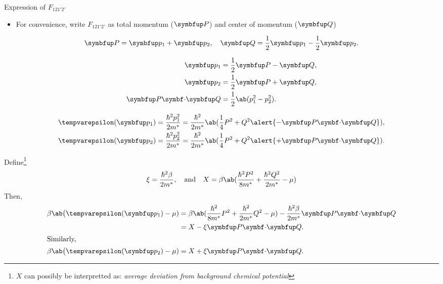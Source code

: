 \begin{frame}{Expression of \(F_{121'2'}\)}
  \begin{itemize}
    \item For convenience, write \(F_{121'2'}\) as \alert{total momentum} (\(\vv{P}\)) and \alert{center of momentum} (\(\vv{Q}\))
  \end{itemize}

  \begin{blk}{}
    \begin{equation}
      \vv{P} = \vv{p}_1 + \vv{p}_2, \quad \vv{Q} = \frac{1}{2}\vv{p}_1 - \frac{1}{2}\vv{p}_2.
    \end{equation}
  \end{blk}
\end{frame}

\begin{frame}
  \begin{align}
    \vv{p}_1            & = \frac{1}{2}\vv{P} - \vv{Q},    \\
    \vv{p}_2            & = \frac{1}{2}\vv{P} + \vv{Q},    \\
    \vv{P} \vdot \vv{Q} & = \frac{1}{2}\ab(p_1^2 - p_2^2).
  \end{align}

  \begin{align}
    \epsilon(\vv{p}_1) & = \frac{\hbar^2 p_1^2}{2 m^*} = \frac{\hbar^2}{2 m^*}\ab(\frac{1}{4}P^2 + Q^2 \alert{- \vv{P} \vdot \vv{Q}}), \\
    \epsilon(\vv{p}_2) & = \frac{\hbar^2 p_2^2}{2 m^*} = \frac{\hbar^2}{2 m^*}\ab(\frac{1}{4}P^2 + Q^2 \alert{+ \vv{P} \vdot \vv{Q}}).
  \end{align}
\end{frame}

\begin{frame}
  Define\footnote{\(X\) can possibly be interpretted as: \emph{average deviation from background chemical potential}}
  \begin{equation}
    \xi = \frac{\hbar^2 \beta}{2 m^*}, \mathand X = \beta\ab(\frac{\hbar^2 P^2}{8 m^*} + \frac{\hbar^2 Q^2}{2 m^*} - \mu)
  \end{equation}
  Then,
  \begin{align}
    \beta\ab\big(\epsilon(\vv{p}_1) - \mu)
                                           & = \beta\ab(\frac{\hbar^2}{8 m^*} P^2 + \frac{\hbar^2}{2 m^*} Q^2 - \mu) - \frac{\hbar^2\beta}{2 m^*} \vv{P} \vdot \vv{Q} \\
                                           & = X - \xi \vv{P} \vdot \vv{Q}.                                                                                           \\
    \shortintertext{Similarly,}
    \beta\ab\big(\epsilon(\vv{p}_2) - \mu) & = X + \xi \vv{P} \vdot \vv{Q}.
  \end{align}
\end{frame}

